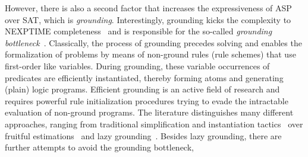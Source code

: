 \documentclass{article}
\begin{document}
However, there is also a second factor that 
increases the expressiveness of ASP over SAT, which is \emph{grounding}. %
Interestingly, grounding kicks the complexity to NEXPTIME completeness~\cite{}
and is responsible for the so-called \emph{grounding bottleneck}~\cite{CuteriEtAl20,TsamouraEtAl20}.
Classically, the process of grounding precedes solving and 
enables the formalization of problems %
by means of non-ground rules (rule schemes) that use first-order like variables.
%
During grounding, these variable occurrences of predicates are efficiently instantiated,
thereby forming atoms and generating (plain) logic programs.
%
%
%
%
%
%
%
Efficient grounding is an active field of research and requires powerful rule initialization procedures trying to 
evade the intractable evaluation of non-ground programs. %
The literature distinguishes many different approaches, %
ranging from traditional simplification and instantiation tactics~\cite{GebserEtAl19,AlvianoEtAl19,KaminskiSchaub21} over
fruitful estimations~\cite{HippenLierler21} and lazy grounding~\cite{%
BomansonJanhunenWeinzierl19,WeinzierlTaupeFriedrich20}. %
%
%
%
Besides lazy grounding, there are further attempts to avoid the grounding bottleneck, %
\end{document}
